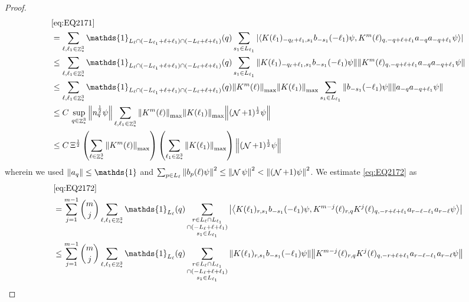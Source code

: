 \documentclass[sn-mathphys, Numbered ,a4paper]{sn-jnl}%
\DeclareMathOperator{\Z}{\mathbb{Z}}
\DeclareMathOperator{\NN}{\mathcal{N}}
\newcommand{\half}{\frac{1}{2}}
\newcommand{\eva}[1]{\left\langle #1 \right\rangle}
\theoremstyle{plain}
\theoremstyle{definition}
\theoremstyle{remark}
\theoremstyle{plain}
\theoremstyle{definition}
\theoremstyle{remark}
\begin{document}
\begin{proof}
\begin{align}
	&\eqref{eq:EQ2171}\nonumber\\
	&=\sum\limits_{\ell, \ell_1\in \Z^3_*} \mathds{1}_{L_{\ell} \cap (-L_{\ell_1}+\ell+\ell_1) \cap (-L_{\ell}+\ell+\ell_1)}(q) \sum\limits_{s_1 \in L_{\ell_1}} \abs{\eva{  K(\ell_1)_{-q_\ell+\ell_1,s_1} b_{-s_1}(-\ell_1) \psi, K^m(\ell)_{q,-q+\ell+\ell_1}a_{-q}a_{-q+\ell_1} \psi }}\nonumber\\
	&\leq \sum\limits_{\ell, \ell_1\in \Z^3_*} \mathds{1}_{L_{\ell} \cap (-L_{\ell_1}+\ell+\ell_1) \cap (-L_{\ell}+\ell+\ell_1)}(q) \sum\limits_{s_1 \in L_{\ell_1}} \norm{  K(\ell_1)_{-q_\ell+\ell_1,s_1} b_{-s_1}(-\ell_1) \psi}\norm{ K^m(\ell)_{q,-q+\ell+\ell_1}a_{-q}a_{-q+\ell_1} \psi }\nonumber\\
	&\leq \sum\limits_{\ell, \ell_1\in \Z^3_*} \mathds{1}_{L_{\ell} \cap (-L_{\ell_1}+\ell+\ell_1) \cap (-L_{\ell}+\ell+\ell_1)}(q)  \norm{K^m(\ell)}_{\mathrm{max}} \norm{K(\ell_1)}_{\mathrm{max}} \sum\limits_{s_1 \in L_{\ell_1}} \norm{ b_{-s_1}(-\ell_1) \psi}\norm{ a_{-q}a_{-q+\ell_1} \psi }\nonumber\\
	&\leq C\,\sup\limits_{q\in \Z^3_*}\norm{n_q^\half\psi} \sum\limits_{\ell, \ell_1\in \Z^3_*}  \norm{K^m(\ell)}_{\mathrm{max}} \norm{K(\ell_1)}_{\mathrm{max}}\norm{(\NN+1)^\half\psi}\nonumber\\
	 &\leq C\, \Xi^\half \left(\sum\limits_{\ell \in \Z^3_*} \norm{K^m(\ell)}_{\mathrm{max}}\right)\left( \sum\limits_{\ell_1\in \Z^3_*} \norm{ K(\ell_1)}_{\mathrm{max}} \right) \norm{(\NN+1)^\half\psi}\label{eq:estEQ2171}
\end{align}
wherein we used $\norm{a_q} \leq \mathds{1}$ and $\sum_{p\in L_\ell}\norm{b_p(\ell) \psi}^2\leq\norm{\NN\psi}^2<\norm{(\NN+1)\psi}^2$.
We estimate \eqref{eq:EQ2172} as
\begin{align}
	&\eqref{eq:EQ2172}\nonumber\\
	&=\sum\limits_{j=1}^{m-1} {{m}\choose j} \sum\limits_{\ell, \ell_1\in \Z^3_*}\mathds{1}_{L_{\ell}}(q) \sum\limits_{\substack{r\in L_{\ell} \cap L_{\ell_1} \\ \cap (-L_{\ell}+\ell+\ell_1)\\s_1\in L_{\ell_1}}}  \abs{\eva{K(\ell_1)_{r,s_1} b_{-s_1}(-\ell_1) \psi, K^{m-j}(\ell)_{r,q} K^j(\ell)_{q,-r+\ell+\ell_1} a_{r-\ell-\ell_1} a_{r-\ell} \psi }}\nonumber\\
	&\leq\sum\limits_{j=1}^{m-1} {{m}\choose j} \sum\limits_{\ell, \ell_1\in \Z^3_*}\mathds{1}_{L_{\ell}}(q) \sum\limits_{\substack{r\in L_{\ell} \cap L_{\ell_1} \\ \cap (-L_{\ell}+\ell+\ell_1)\\s_1\in L_{\ell_1}}}  \norm{K(\ell_1)_{r,s_1} b_{-s_1}(-\ell_1) \psi}\norm{ K^{m-j}(\ell)_{r,q} K^j(\ell)_{q,-r+\ell+\ell_1} a_{r-\ell-\ell_1} a_{r-\ell} \psi }\nonumber\\

\end{align}
\end{proof}
\end{document}
